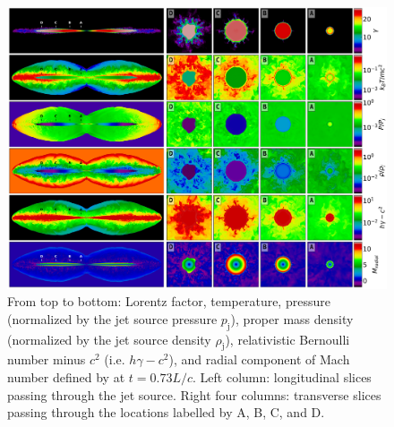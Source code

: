 \begin{figure}
	\includegraphics[width=\linewidth]{figures/JetAccLowRes.png}
    \caption{
    From top to bottom: Lorentz factor, temperature, pressure (normalized by the jet source pressure $p_{\text{j}}$), proper mass density (normalized by the jet source density $\rho_{\text{j}}$), relativistic Bernoulli number minus $c^2$ (i.e. $h\gamma-c^2$), and radial component of Mach number defined by  at $t=0. 73 L/c$. Left column: longitudinal slices passing through the jet source. Right four columns: transverse slices passing through the locations labelled by A, B, C, and D.}
   \label{fig:Limb_brightened_jet}
\end{figure}



